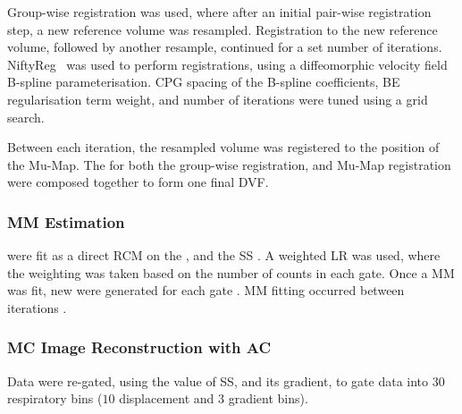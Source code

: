                 Group-wise registration was used, where after an initial pair-wise registration step, a new reference volume was resampled. Registration to the new reference volume, followed by another resample, continued for a set number of iterations. NiftyReg~\parencite{Modat2010} was used to perform registrations, using a diffeomorphic velocity field B-spline parameterisation. \gls{CPG} spacing of the B-spline coefficients, \gls{BE} regularisation term weight, and number of iterations were tuned using a grid search.
                
                Between each iteration, the resampled volume was registered to the position of the \gls{Mu-Map}. The  for both the group-wise registration, and \gls{Mu-Map} registration were composed together to form one final \gls{DVF}.%
            
            
            \subsubsection{MM Estimation} \label{sec:pet_ct_motion_correction_exploiting_motion_models_fit_on_coarsely_gated_data_applied_to_finely_gated_data_methods_motion_model_estimation}
                 were fit as a direct \gls{RCM} on the , %
                and the \gls{SS}%
                . A weighted \gls{LR} was used, where the weighting was taken based on the number of counts in each gate. Once a \gls{MM} was fit, new  were generated for each gate%
                . \gls{MM} fitting occurred between iterations%
                .
            
            
            \subsubsection{MC Image Reconstruction with AC} \label{sec:pet_ct_motion_correction_exploiting_motion_models_fit_on_coarsely_gated_data_applied_to_finely_gated_data_methods_mc_image_reconstruction_with_ac}
                Data were re-gated, using the value of \gls{SS}, and its gradient, to gate data into $30$ respiratory bins ($10$ displacement and $3$ gradient bins).
                
